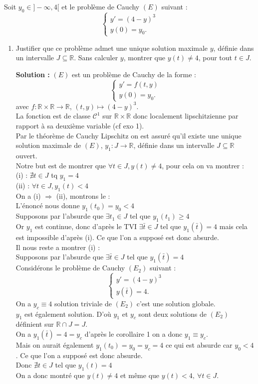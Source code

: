 \documentclass[12pt,a4paper]{article}
\newcommand{\R}{\mathbb{R}}
\newcommand{\solution}[1]{\par\noindent\textbf{\color{OliveGreen}Solution :} \textcolor{OliveGreen}{#1}}
\begin{document}
\begin{exo}
  Soit $y_0\in]-\infty,4[$ et le problème de Cauchy $(E)$ suivant :
 $$
\begin{cases}
y'=(4-y)^3\\
y(0)=y_0.
\end{cases}
$$
\begin{enumerate}
    \item Justifier que ce problème admet une unique solution maximale $y$, définie dans un intervalle $J\subseteq\R$. Sans calculer $y$, montrer que $y(t)\neq4$, pour tout $t\in J$.
\solution{
$(E)$ est un problème de Cauchy de la forme :
 $$
\begin{cases}
y'=f(t,y)\\
y(0)=y_0.
\end{cases}
$$
avec $f : \R \times \R \to \R$, $(t,y) \mapsto (4-y)^3$.\\
La fonction est de classe $\mathcal{C}^1$ sur $\R\times\R$ donc localement lipschitzienne par rapport à sa deuxième variable (cf exo 1).\\
Par le théorème de Cauchy Lipschitz on est assuré qu'il existe une unique solution maximale de $(E)$, $y_1 : J \to \R$, définie dans un intervalle $J \subseteq \R$ ouvert.\\
Notre but est  de montrer que $\forall t \in J, y(t) \ne 4$, pour cela on va montrer :\\
    (i) : $\nexists t \in J$ tq $y_1 = 4$\\
    (ii) : $\forall t \in J, y_1(t) < 4$\\
On a (i) $\Rightarrow$ (ii), montrons le :\\
L'énoncé nous donne $y_1(t_0) = y_0 < 4$\\
Supposons par l'absurde que $\exists t_1 \in J$ tel que $y_1(t_1) \geq 4$\\
Or $y_1$ est continue, donc d'après le TVI $\exists \bar{t} \in J$ tel que $y_1(\bar{t}) = 4$ mais cela est impossible d'après (i). Ce que l'on a supposé est donc absurde. \\
Il nous reste a montrer (i) : \\
Supposons par l'absurde que $\exists \bar{t} \in J$ tel que $y_1(\bar{t}) = 4$\\
Considérons le problème de Cauchy $(E_2)$ suivant :
$$
\begin{cases}
y'=(4-y)^3\\
y(\bar{t})=4.
\end{cases}
$$
On a $y_c \equiv 4$ solution triviale de $(E_2)$ c'est une solution globale.\\
$y_1$ est également solution.
D'où $y_1$ et $y_c$ sont deux solutions de $(E_2)$ définient sur $\R \cap J = J$.\\
		On a $y_1(\bar{t}) = 4 = y_c$ d'après le corollaire 1 on a donc $y_1 \equiv y_c$.\\
Mais on aurait également $y_1(t_0) = y_0 = y_c = 4$ ce qui est absurde car $y_0 < 4$. Ce que l'on a supposé est donc absurde.\\
Donc $\nexists t \in J$ tel que $y_1(t) = 4$\\
On a donc montré que $y(t) \ne 4$ et même que $y(t) < 4, ~ \forall t \in J$.}


\end{enumerate}
\end{exo}
\end{document}
